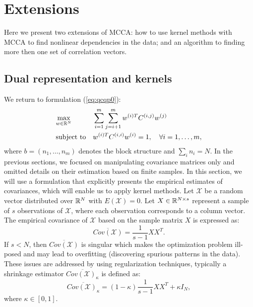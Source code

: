 

\vspace{-0.1cm}
\section{Extensions}\label{sec:sumcorextensions}
Here we present two extensions of MCCA: how to use kernel methods with
MCCA to find nonlinear dependencies in the data; and an
algorithm to finding more then one set of correlation vectors.
\subsection{Dual representation and kernels}\label{subsec:kernels}
We return to formulation (\ref{eq:qcqp0}):
 \begin{equation*}
\begin{aligned}
& \underset{w \in \mathbb{R}^N}{\text{max}}
& & \sum_{i = 1}^m \sum_{j = i+1 }^m w^{(i)T} C^{(i,j)} w^{(j)}\\
& \text{subject to}
& &w^{(i)T} C^{(i,i)} w^{(i)} = 1, \quad\forall i = 1,\ldots, m,
\end{aligned}
\end{equation*}
  where $b = \left(n_1,\ldots,n_m\right)$ denotes the block structure
  and $ \sum_i n_i = N $.
 In the previous sections, we focused on manipulating covariance matrices only and omitted details on their estimation based on finite samples. In this section, we will use a formulation that explicitly presents the empirical estimates of covariances, which will enable us to apply kernel methods.
Let $\mathcal{X}$ be a random vector distributed over $\mathbb{R}^N$ with
$E\left(\mathcal{X}\right) = 0$. Let $X \in \mathbb{R}^{N \times s}$
represent a sample of $s$ observations of $\mathcal{X}$, where each
observation corresponds to a column vector. The empirical covariance of $\mathcal{X}$ based on the sample matrix $X$ is expressed as: $$ \overline{Cov\left(\mathcal{X}\right)} = \frac{1}{s - 1}X X^T.$$
If $s < N$, then $\overline{Cov\left(\mathcal{X}\right)}$ is singular which makes the optimization problem ill-posed and may lead to overfitting (discovering spurious patterns in the data). These issues are addressed by using regularization techniques, typically a shrinkage estimator $\overline{Cov\left(\mathcal{X}\right)_{\kappa}}$ is defined as: $$ \overline{Cov\left(\mathcal{X}\right)_{\kappa}} = \left(1-\kappa\right) \frac{1}{s - 1}X X^T + \kappa  I_N,$$ where $\kappa \in \left[0,1\right]$.

